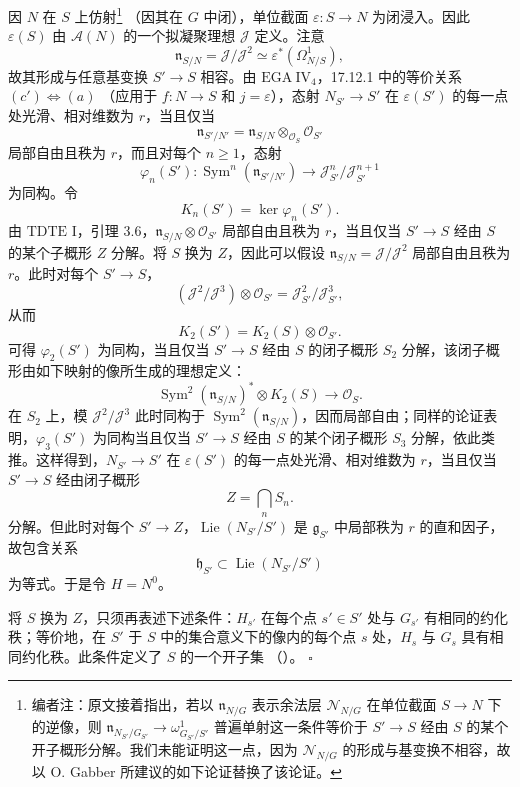 因 \(N\) 在 \(S\) 上仿射\footnote{编者注：原文接着指出，若以 \(\mathfrak n_{N/G}\) 表示余法层 \(\mathcal N_{N/G}\) 在单位截面 \(S\to N\) 下的逆像，则
\(\mathfrak n_{N_{S'}/G_{S'}}\to
\omega^1_{G_{S'}/S'}\)
普遍单射这一条件等价于 \(S'\to S\) 经由 \(S\) 的某个开子概形分解。我们未能证明这一点，因为 \(\mathcal N_{N/G}\) 的形成与基变换不相容，故以 O. Gabber 所建议的如下论证替换了该论证。}
\textup{（因其在 \(G\) 中闭）}，单位截面 \(\varepsilon\colon S\to N\) 为闭浸入。因此 \(\varepsilon(S)\) 由 \(\mathcal A(N)\) 的一个拟凝聚理想 \(\mathcal J\) 定义。注意
\[
  \mathfrak n_{S/N}=\mathcal J/\mathcal J^2
  \simeq \varepsilon^*(\Omega^1_{N/S}),
\]
故其形成与任意基变换 \(S'\to S\) 相容。由 \(\mathrm{EGA}\ \mathrm{IV}_4\)，17.12.1 中的等价关系 \textup{\((c')\Longleftrightarrow(a)\)} \textup{（应用于 \(f\colon N\to S\) 和 \(j=\varepsilon\)）}，态射 \(N_{S'}\to S'\) 在 \(\varepsilon(S')\) 的每一点处光滑、相对维数为 \(r\)，当且仅当
\[
  \mathfrak n_{S'/N'}
  =
  \mathfrak n_{S/N}\otimes_{\mathcal O_S}\mathcal O_{S'}
\]
局部自由且秩为 \(r\)，而且对每个 \(n\geq1\)，态射
\[
  \varphi_n(S')\colon
  \operatorname{Sym}^n(\mathfrak n_{S'/N'})
  \longrightarrow
  \mathcal J_{S'}^n/\mathcal J_{S'}^{n+1}
\]
为同构。令
\[
  K_n(S')=\ker\varphi_n(S').
\]
由 \(\mathrm{TDTE}\) I，引理 3.6，\(\mathfrak n_{S/N}\otimes\mathcal O_{S'}\) 局部自由且秩为 \(r\)，当且仅当 \(S'\to S\) 经由 \(S\) 的某个子概形 \(Z\) 分解。将 \(S\) 换为 \(Z\)，因此可以假设 \(\mathfrak n_{S/N}=\mathcal J/\mathcal J^2\) 局部自由且秩为 \(r\)。此时对每个 \(S'\to S\)，
\[
  (\mathcal J^2/\mathcal J^3)\otimes\mathcal O_{S'}
  =
  \mathcal J_{S'}^2/\mathcal J_{S'}^3,
\]
从而
\[
  K_2(S')=K_2(S)\otimes\mathcal O_{S'}.
\]
可得 \(\varphi_2(S')\) 为同构，当且仅当 \(S'\to S\) 经由 \(S\) 的闭子概形 \(S_2\) 分解，该闭子概形由如下映射的像所生成的理想定义：
\[
  \operatorname{Sym}^2(\mathfrak n_{S/N})^*
  \otimes K_2(S)
  \longrightarrow
  \mathcal O_S.
\]
在 \(S_2\) 上，模 \(\mathcal J^2/\mathcal J^3\) 此时同构于 \(\operatorname{Sym}^2(\mathfrak n_{S/N})\)，因而局部自由；同样的论证表明，\(\varphi_3(S')\) 为同构当且仅当 \(S'\to S\) 经由 \(S\) 的某个闭子概形 \(S_3\) 分解，依此类推。这样得到，\(N_{S'}\to S'\) 在 \(\varepsilon(S')\) 的每一点处光滑、相对维数为 \(r\)，当且仅当 \(S'\to S\) 经由闭子概形
\[
  Z=\bigcap_n S_n.
\]
分解。但此时对每个 \(S'\to Z\)，\(\operatorname{Lie}(N_{S'}/S')\) 是 \(\mathfrak g_{S'}\) 中局部秩为 \(r\) 的直和因子，故包含关系
\[
  \mathfrak h_{S'}
  \subset
  \operatorname{Lie}(N_{S'}/S')
\]
为等式。于是令 \(H=N^0\)。

将 \(S\) 换为 \(Z\)，只须再表述下述条件：\(H_{s'}\) 在每个点 \(s'\in S'\) 处与 \(G_{s'}\) 有相同的约化秩；等价地，在 \(S'\) 于 \(S\) 中的集合意义下的像内的每个点 \(s\) 处，\(H_s\) 与 \(G_s\) 具有相同约化秩。此条件定义了 \(S\) 的一个开子集 \textup{（）}。
\hfill\(\square\)

